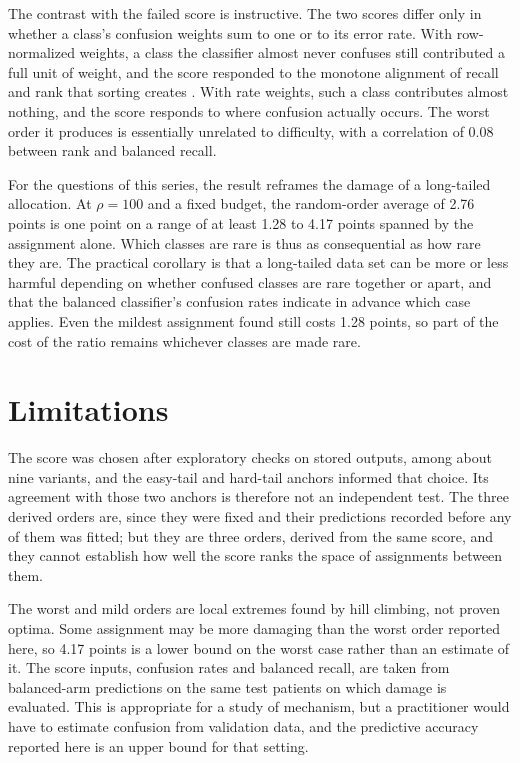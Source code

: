 The contrast with the failed score is instructive. The two scores differ only in whether a class's confusion weights sum to one or to its error rate. With row-normalized weights, a class the classifier almost never confuses still contributed a full unit of weight, and the score responded to the monotone alignment of recall and rank that sorting creates \citep{queisler2026worstTcga}. With rate weights, such a class contributes almost nothing, and the score responds to where confusion actually occurs. The worst order it produces is essentially unrelated to difficulty, with a correlation of 0.08 between rank and balanced recall.

For the questions of this series, the result reframes the damage of a long-tailed allocation. At $\rho=100$ and a fixed budget, the random-order average of 2.76 points is one point on a range of at least 1.28 to 4.17 points spanned by the assignment alone. Which classes are rare is thus as consequential as how rare they are. The practical corollary is that a long-tailed data set can be more or less harmful depending on whether confused classes are rare together or apart, and that the balanced classifier's confusion rates indicate in advance which case applies. Even the mildest assignment found still costs 1.28 points, so part of the cost of the ratio remains whichever classes are made rare.

\section{Limitations}
\label{sec:limitations}
The score was chosen after exploratory checks on stored outputs, among about nine variants, and the easy-tail and hard-tail anchors informed that choice. Its agreement with those two anchors is therefore not an independent test. The three derived orders are, since they were fixed and their predictions recorded before any of them was fitted; but they are three orders, derived from the same score, and they cannot establish how well the score ranks the space of assignments between them.

The worst and mild orders are local extremes found by hill climbing, not proven optima. Some assignment may be more damaging than the worst order reported here, so 4.17 points is a lower bound on the worst case rather than an estimate of it. The score inputs, confusion rates and balanced recall, are taken from balanced-arm predictions on the same test patients on which damage is evaluated. This is appropriate for a study of mechanism, but a practitioner would have to estimate confusion from validation data, and the predictive accuracy reported here is an upper bound for that setting.

